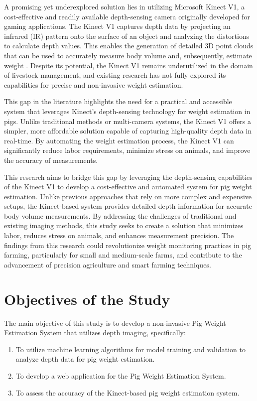 {A promising yet underexplored solution lies in utilizing Microsoft Kinect V1, a cost-effective and readily available depth-sensing camera originally developed for gaming applications. The Kinect V1 captures depth data by projecting an infrared (IR) pattern onto the surface of an object and analyzing the distortions to calculate depth values. This enables the generation of detailed 3D point clouds that can be used to accurately measure body volume and, subsequently, estimate weight \citep{Zhang2012}. Despite its potential, the Kinect V1 remains underutilized in the domain of livestock management, and existing research has not fully explored its capabilities for precise and non-invasive weight estimation.

This gap in the literature highlights the need for a practical and accessible system that leverages Kinect’s depth-sensing technology for weight estimation in pigs. Unlike traditional methods or multi-camera systems, the Kinect V1 offers a simpler, more affordable solution capable of capturing high-quality depth data in real-time. By automating the weight estimation process, the Kinect V1 can significantly reduce labor requirements, minimize stress on animals, and improve the accuracy of measurements.

This research aims to bridge this gap by leveraging the depth-sensing capabilities of the Kinect V1 to develop a cost-effective and automated system for pig weight estimation. Unlike previous approaches that rely on more complex and expensive setups, the Kinect-based system provides detailed depth information for accurate body volume measurements. By addressing the challenges of traditional and existing imaging methods, this study seeks to create a solution that minimizes labor, reduces stress on animals, and enhances measurement precision. The findings from this research could revolutionize weight monitoring practices in pig farming, particularly for small and medium-scale farms, and contribute to the advancement of precision agriculture and smart farming techniques.


\section{Objectives of the Study}

The main objective of this study is to develop a non-invasive Pig Weight Estimation System that utilizes depth imaging, specifically:
\begin{enumerate}
	\item To utilize machine learning algorithms for model training and validation to analyze depth data for pig weight estimation. 
	\item To develop a web application for the Pig Weight Estimation System.
	\item To assess the accuracy of the Kinect-based pig weight estimation system.
\end{enumerate}

}

